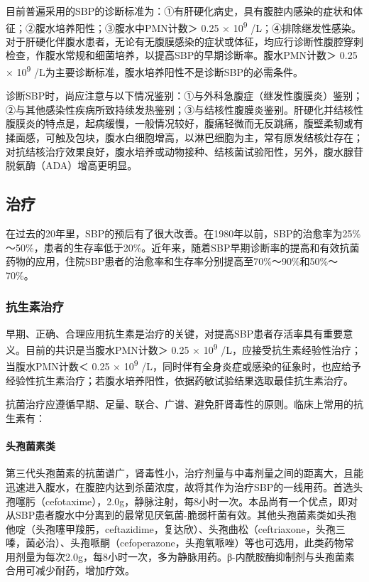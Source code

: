 目前普遍采用的SBP的诊断标准为：①有肝硬化病史，具有腹腔内感染的症状和体征；②腹水培养阳性；③腹水中PMN计数＞
0.25 × 10\textsuperscript{9}
/L；④排除继发性感染。对于肝硬化伴腹水患者，无论有无腹膜感染的症状或体征，均应行诊断性腹腔穿刺检查，作腹水常规和细菌培养，以提高SBP的早期诊断率。腹水PMN计数＞
0.25 × 10\textsuperscript{9}
/L为主要诊断标准，腹水培养阳性不是诊断SBP的必需条件。

诊断SBP时，尚应注意与以下情况鉴别：①与外科急腹症（继发性腹膜炎）鉴别；②与其他感染性疾病所致持续发热鉴别；③与结核性腹膜炎鉴别。肝硬化并结核性腹膜炎的特点是，起病缓慢，一般情况较好，腹痛轻微而无反跳痛，腹壁柔韧或有揉面感，可触及包块，腹水白细胞增高，以淋巴细胞为主，常有原发结核灶存在；对抗结核治疗效果良好，腹水培养或动物接种、结核菌试验阳性，另外，腹水腺苷脱氨酶（ADA）增高更明显。

\subsection{治疗}

在过去的20年里，SBP的预后有了很大改善。在1980年以前，SBP的治愈率为25\%～50\%，患者的生存率低于20\%。近年来，随着SBP早期诊断率的提高和有效抗菌药物的应用，住院SBP患者的治愈率和生存率分别提高至70\%～90\%和50\%～70\%。

\subsubsection{抗生素治疗}

早期、正确、合理应用抗生素是治疗的关键，对提高SBP患者存活率具有重要意义。目前的共识是当腹水PMN计数＞
0.25 × 10\textsuperscript{9} /L，应接受抗生素经验性治疗；当腹水PMN计数＜
0.25 × 10\textsuperscript{9}
/L，同时伴有全身炎症或感染的征象时，也应给予经验性抗生素治疗；若腹水培养阳性，依据药敏试验结果选取最佳抗生素治疗。

抗菌治疗应遵循早期、足量、联合、广谱、避免肝肾毒性的原则。临床上常用的抗生素有：

\paragraph{头孢菌素类}

第三代头孢菌素的抗菌谱广，肾毒性小，治疗剂量与中毒剂量之间的距离大，且能迅速进入腹水，在腹腔内达到杀菌浓度，故将其作为治疗SBP的一线用药。首选头孢噻肟（cefotaxime），2.0g，静脉注射，每8小时一次。本品尚有一个优点，即对从SBP患者腹水中分离到的最常见厌氧菌-脆弱杆菌有效。其他头孢菌素类如头孢他啶（头孢噻甲羧肟，ceftazidime，复达欣）、头孢曲松（ceftriaxone，头孢三嗪，菌必治）、头孢哌酮（cefoperazone，头孢氧哌唑）等也可选用，此类药物常用剂量为每次2.0g，每8小时一次，多为静脉用药。β-内酰胺酶抑制剂与头孢菌素合用可减少耐药，增加疗效。


